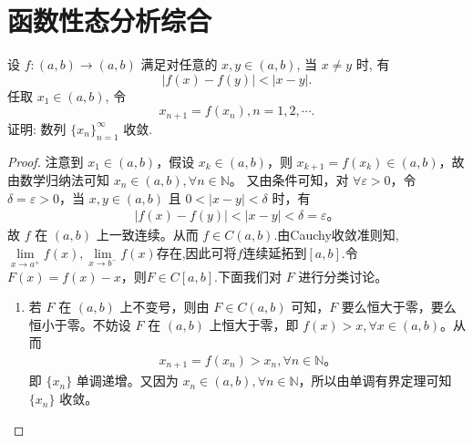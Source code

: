 \documentclass[../../main.tex]{subfiles}%
\begin{document}
\section{函数性态分析综合}

\begin{proposition}
设 $f : (a, b) \to (a, b)$ 满足对任意的 $x, y \in (a, b)$, 当 $x \neq y$ 时, 有 
$$
\left| f(x) - f(y) \right| < \left| x - y \right|.
$$ 
任取 $x_1 \in (a, b)$, 令 $$
x_{n+1} = f(x_n), n = 1, 2, \cdots.
$$
证明: 数列 $\{x_n\}_{n=1}^{\infty}$ 收敛.
\end{proposition}
\begin{proof}

注意到 $x_1 \in (a, b)$，假设 $x_k \in (a, b)$，则 $x_{k+1} = f(x_k) \in (a, b)$，故由数学归纳法可知 $x_n \in (a, b), \forall n \in \mathbb{N}$。
又由条件可知，对 $\forall \varepsilon > 0$，令 $\delta = \varepsilon > 0$，当 $x, y \in (a, b)$ 且 $0 < |x - y| < \delta$ 时，有
\begin{align*}
|f(x) - f(y)| < |x - y| < \delta = \varepsilon。
\end{align*}
故 $f$ 在 $(a, b)$ 上一致连续。从而 $f \in C(a, b)$.由Cauchy收敛准则知,$\underset{x\rightarrow a^+}{\lim}f\left( x \right) ,\underset{x\rightarrow b^-}{\lim}f\left( x \right) $存在,因此可将$f$连续延拓到$[a,b]$.令 $F(x) = f(x) - x$，则$F \in C[a, b]$.下面我们对 $F$ 进行分类讨论。

\begin{enumerate}[(1)]
\item 若 $F$ 在 $(a, b)$ 上不变号，则由 $F \in C(a, b)$ 可知，$F$ 要么恒大于零，要么恒小于零。不妨设 $F$ 在 $(a, b)$ 上恒大于零，即 $f(x) > x, \forall x \in (a, b)$。从而
\begin{align*}
x_{n+1} = f(x_n) > x_n, \forall n \in \mathbb{N}。
\end{align*}
即 $\{x_n\}$ 单调递增。又因为 $x_n \in (a, b), \forall n \in \mathbb{N}$，所以由单调有界定理可知 $\{x_n\}$ 收敛。


\end{enumerate}
\end{proof}
\end{document}
